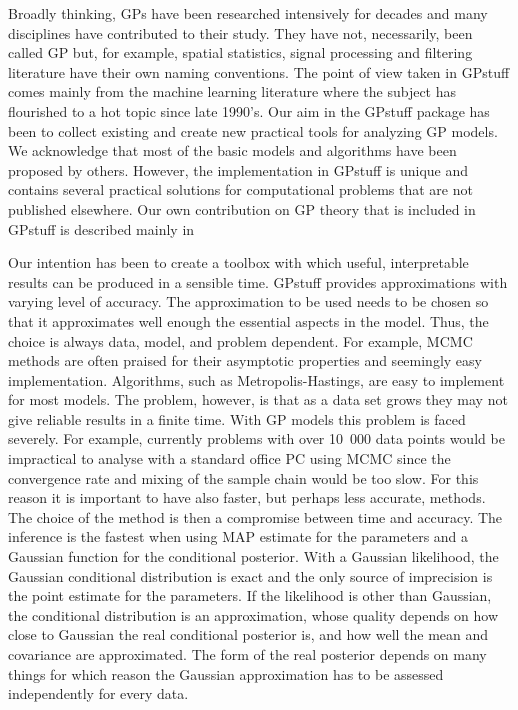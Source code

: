 \documentclass[twoside,11pt]{article}
\newcommand{\pkg}[1]{{\fontseries{b}\selectfont #1}}
\begin{document}
Broadly thinking, GPs have been researched intensively for decades and
many disciplines have contributed to their study. They have not,
necessarily, been called GP but, for example, spatial statistics,
signal processing and filtering literature have their own naming
conventions. The point of view taken in \pkg{GPstuff} comes mainly
from the machine learning literature where the subject has flourished
to a hot topic since late 1990's. Our aim in the \pkg{GPstuff} package
has been to collect existing and create new practical tools for
analyzing GP models. We acknowledge that most of the basic models and
algorithms have been proposed by others. However, the implementation
in \pkg{GPstuff} is unique and contains several practical solutions
for computational problems that are not published elsewhere. Our own
contribution on GP theory that is included in \pkg{GPstuff} is
described mainly in
\citep{Vanhatalo+Vehtari:2007,Vanhatalo+Vehtari:2008,Vanhatalo+Vehtari:2010,Vanhatalo+Jylanki+Vehtari:2009,Vanhatalo+Pietilainen+Vehtari:2010,Jylanki+Vanhatalo+Vehtari:2011}

Our intention has been to create a toolbox with which useful,
interpretable results can be produced in a sensible time.
\pkg{GPstuff} provides approximations with varying level of accuracy.
The approximation to be used needs to be chosen so that it
approximates well enough the essential aspects in the model. Thus, the
choice is always data, model, and problem dependent. For example, MCMC
methods are often praised for their asymptotic properties and
seemingly easy implementation.  Algorithms, such as
Metropolis-Hastings, are easy to implement for most models. The
problem, however, is that as a data set grows they may not give
reliable results in a finite time. With GP models this problem is
faced severely. For example, currently problems with over 10~000 data
points would be impractical to analyse with a standard office PC using
MCMC since the convergence rate and mixing of the sample chain would
be too slow. For this reason it is important to have also faster, but
perhaps less accurate, methods.  The choice of the method is then a
compromise between time and accuracy. The inference is the fastest
when using MAP estimate for the parameters and a Gaussian function for
the conditional posterior.  With a Gaussian likelihood, the Gaussian
conditional distribution is exact and the only source of imprecision
is the point estimate for the parameters. If the likelihood is other
than Gaussian, the conditional distribution is an approximation, whose
quality depends on how close to Gaussian the real conditional
posterior is, and how well the mean and covariance are approximated.
The form of the real posterior depends on many things for which reason
the Gaussian approximation has to be assessed independently for every
data.
\end{document}
